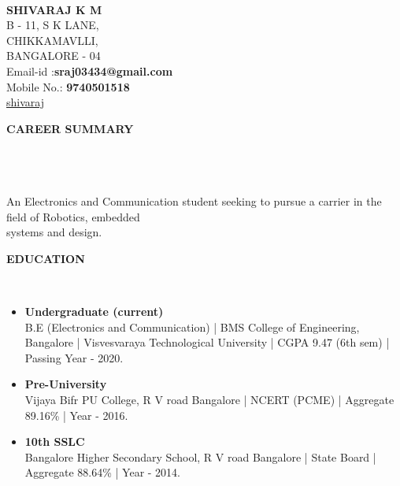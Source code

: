 \documentclass[a4paper,10pt]{article}
\newcommand{\lsep}{-0.5cm}
\newcommand{\resheading}[1]{{\small \colorbox{mygrey}{\begin{minipage}{0.975\textwidth}{\textbf{#1 \vphantom{p\^{E}}}}\end{minipage}}}}
\begin{document}
\hspace{0.5cm}\\[-0.2cm]



\textbf{SHIVARAJ K M} \\ 
\indent B - 11, S K LANE, \\
\indent CHIKKAMAVLLI,\\
\indent BANGALORE - 04\\
\indent Email-id :\textbf{sraj03434@gmail.com} \\
\indent Mobile No.: \textbf{9740501518} \\
\indent\faGithub\href{https://github.com/shiva-raj-km}{   shivaraj}\hfill 
{}\\

\resheading{\textbf{CAREER SUMMARY} }\\[\lsep]\\ \\
\indent An Electronics and Communication student seeking to pursue a carrier in the field of Robotics,  embedded\\ \indent systems and design.\\

\resheading{\textbf{EDUCATION} }\\[\lsep]
\begin{itemize}
\item \noindent \textbf{Undergraduate (current)}\\
\indent B.E (Electronics and Communication) | BMS College of Engineering, Bangalore | Visvesvaraya Technological University | CGPA 9.47 (6th sem) | Passing Year - 2020.

\item \noindent \textbf{Pre-University}\\
\indent Vijaya Bifr PU College, R V road Bangalore | NCERT (PCME) | Aggregate 89.16\% | Year - 2016.

\item \noindent \textbf{10th SSLC}\\
\indent Bangalore Higher Secondary School, R V road Bangalore | State Board | Aggregate 88.64\% | Year - 2014.
\end{itemize}
\end{document}
